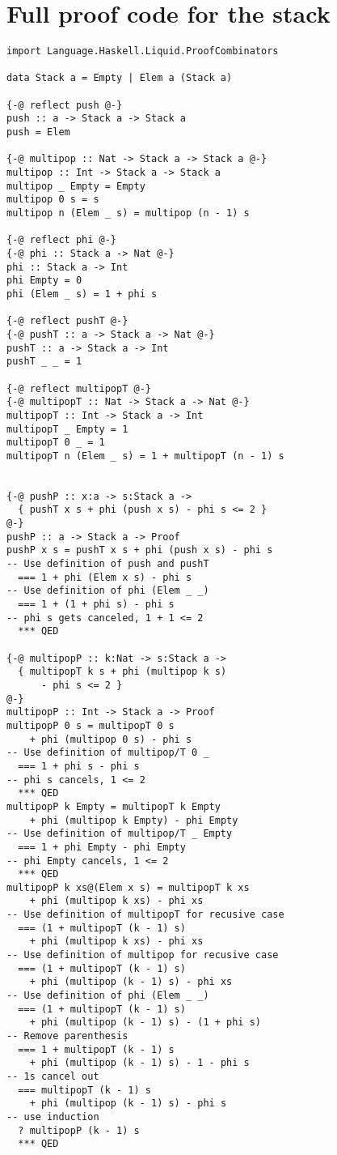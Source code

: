 \documentclass[sigplan,screen]{acmart}
\begin{document}



\appendix

\section{Full proof code for the stack}

\begin{lstlisting}
import Language.Haskell.Liquid.ProofCombinators

data Stack a = Empty | Elem a (Stack a)

{-@ reflect push @-}
push :: a -> Stack a -> Stack a
push = Elem

{-@ multipop :: Nat -> Stack a -> Stack a @-}
multipop :: Int -> Stack a -> Stack a
multipop _ Empty = Empty
multipop 0 s = s
multipop n (Elem _ s) = multipop (n - 1) s

{-@ reflect phi @-}
{-@ phi :: Stack a -> Nat @-}
phi :: Stack a -> Int
phi Empty = 0
phi (Elem _ s) = 1 + phi s

{-@ reflect pushT @-}
{-@ pushT :: a -> Stack a -> Nat @-}
pushT :: a -> Stack a -> Int
pushT _ _ = 1

{-@ reflect multipopT @-}
{-@ multipopT :: Nat -> Stack a -> Nat @-}
multipopT :: Int -> Stack a -> Int
multipopT _ Empty = 1
multipopT 0 _ = 1
multipopT n (Elem _ s) = 1 + multipopT (n - 1) s


{-@ pushP :: x:a -> s:Stack a ->
  { pushT x s + phi (push x s) - phi s <= 2 }
@-}
pushP :: a -> Stack a -> Proof
pushP x s = pushT x s + phi (push x s) - phi s
-- Use definition of push and pushT
  === 1 + phi (Elem x s) - phi s
-- Use definition of phi (Elem _ _)
  === 1 + (1 + phi s) - phi s
-- phi s gets canceled, 1 + 1 <= 2
  *** QED

{-@ multipopP :: k:Nat -> s:Stack a ->
  { multipopT k s + phi (multipop k s)
      - phi s <= 2 }
@-}
multipopP :: Int -> Stack a -> Proof
multipopP 0 s = multipopT 0 s
    + phi (multipop 0 s) - phi s
-- Use definition of multipop/T 0 _
  === 1 + phi s - phi s
-- phi s cancels, 1 <= 2
  *** QED
multipopP k Empty = multipopT k Empty
    + phi (multipop k Empty) - phi Empty
-- Use definition of multipop/T _ Empty
  === 1 + phi Empty - phi Empty
-- phi Empty cancels, 1 <= 2
  *** QED
multipopP k xs@(Elem x s) = multipopT k xs
    + phi (multipop k xs) - phi xs
-- Use definition of multipopT for recusive case
  === (1 + multipopT (k - 1) s)
    + phi (multipop k xs) - phi xs
-- Use definition of multipop for recusive case
  === (1 + multipopT (k - 1) s)
    + phi (multipop (k - 1) s) - phi xs
-- Use definition of phi (Elem _ _)
  === (1 + multipopT (k - 1) s)
    + phi (multipop (k - 1) s) - (1 + phi s)
-- Remove parenthesis
  === 1 + multipopT (k - 1) s
    + phi (multipop (k - 1) s) - 1 - phi s
-- 1s cancel out
  === multipopT (k - 1) s
    + phi (multipop (k - 1) s) - phi s
-- use induction
  ? multipopP (k - 1) s
  *** QED
\end{lstlisting}
\end{document}

